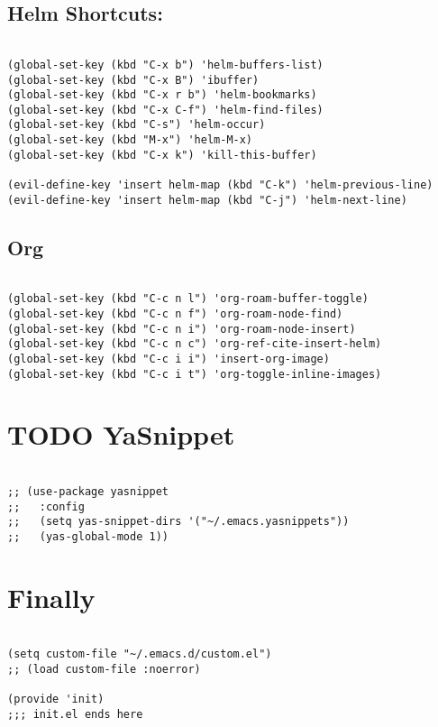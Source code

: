 \documentclass[11pt]{article}
\begin{document}
\subsection{Helm Shortcuts:}
\label{sec:org387e120}

\begin{verbatim}

(global-set-key (kbd "C-x b") 'helm-buffers-list)
(global-set-key (kbd "C-x B") 'ibuffer)
(global-set-key (kbd "C-x r b") 'helm-bookmarks)
(global-set-key (kbd "C-x C-f") 'helm-find-files)
(global-set-key (kbd "C-s") 'helm-occur)
(global-set-key (kbd "M-x") 'helm-M-x)
(global-set-key (kbd "C-x k") 'kill-this-buffer)

(evil-define-key 'insert helm-map (kbd "C-k") 'helm-previous-line)
(evil-define-key 'insert helm-map (kbd "C-j") 'helm-next-line)

\end{verbatim}

\subsection{Org}
\label{sec:org65bf8e6}
\begin{verbatim}

(global-set-key (kbd "C-c n l") 'org-roam-buffer-toggle)
(global-set-key (kbd "C-c n f") 'org-roam-node-find)
(global-set-key (kbd "C-c n i") 'org-roam-node-insert)
(global-set-key (kbd "C-c n c") 'org-ref-cite-insert-helm)
(global-set-key (kbd "C-c i i") 'insert-org-image)
(global-set-key (kbd "C-c i t") 'org-toggle-inline-images)

\end{verbatim}

\section{{\bfseries\sffamily TODO} YaSnippet}
\label{sec:org92f4523}
\begin{verbatim}

;; (use-package yasnippet
;;   :config
;;   (setq yas-snippet-dirs '("~/.emacs.yasnippets"))
;;   (yas-global-mode 1))

\end{verbatim}

\section{Finally}
\label{sec:org03e6a34}
\begin{verbatim}

(setq custom-file "~/.emacs.d/custom.el")
;; (load custom-file :noerror)

(provide 'init)
;;; init.el ends here

\end{verbatim}
\end{document}
